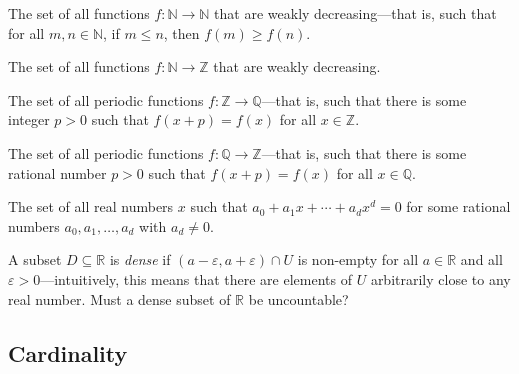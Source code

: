\begin{chapex}
\label{cqDetermineIfCountableBegin}
The set of all functions $f : \mathbb{N} \to \mathbb{N}$ that are weakly decreasing---that is, such that for all $m,n \in \mathbb{N}$, if $m \le n$, then $f(m) \ge f(n)$.
\end{chapex}

\begin{chapex}
The set of all functions $f : \mathbb{N} \to \mathbb{Z}$ that are weakly decreasing.
\end{chapex}


\begin{chapex}
The set of all periodic functions $f : \mathbb{Z} \to \mathbb{Q}$---that is, such that there is some integer $p > 0$ such that $f(x+p) = f(x)$ for all $x \in \mathbb{Z}$.
\end{chapex}

\begin{chapex}
The set of all periodic functions $f : \mathbb{Q} \to \mathbb{Z}$---that is, such that there is some rational number $p > 0$ such that $f(x+p) = f(x)$ for all $x \in \mathbb{Q}$.
\end{chapex}

\begin{chapex}
\label{cqDetermineIfCountableEnd}
The set of all real numbers $x$ such that $a_0 + a_1x + \cdots + a_dx^d = 0$ for some rational numbers $a_0,a_1,\dots,a_d$ with $a_d \ne 0$.
\end{chapex}

\begin{chapex}
A subset $D \subseteq \mathbb{R}$ is \textit{dense} if $(a-\varepsilon, a+\varepsilon) \cap U$ is non-empty for all $a \in \mathbb{R}$ and all $\varepsilon > 0$---intuitively, this means that there are elements of $U$ arbitrarily close to any real number. Must a dense subset of $\mathbb{R}$ be uncountable?
\end{chapex}

\subsection*{Cardinality}

